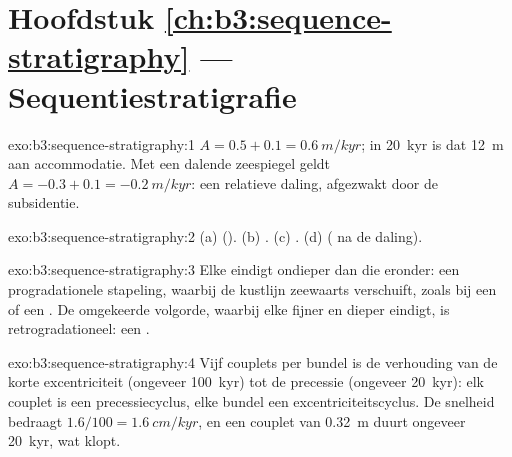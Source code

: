 \section*{Hoofdstuk \ref{ch:b3:sequence-stratigraphy} --- Sequentiestratigrafie}

\begin{solution}{exo:b3:sequence-stratigraphy:1}
$A = 0.5 + 0.1 = \qty{0.6}{m/kyr}$; in \qty{20}{kyr} is dat \qty{12}{m} aan
accommodatie. Met een dalende zeespiegel geldt $A = -0.3 + 0.1 = \qty{-0.2}{m/kyr}$: een relatieve daling,
afgezwakt door de subsidentie.
\end{solution}

\begin{solution}{exo:b3:sequence-stratigraphy:2}
(a)  (). (b) . (c)
. (d)  ( na de daling).
\end{solution}

\begin{solution}{exo:b3:sequence-stratigraphy:3}
Elke  eindigt ondieper dan die eronder: een progradationele stapeling,
waarbij de kustlijn zeewaarts verschuift, zoals bij een  of een . De
omgekeerde volgorde, waarbij elke  fijner en dieper eindigt, is retrogradationeel: een
.
\end{solution}

\begin{solution}{exo:b3:sequence-stratigraphy:4}
Vijf couplets per bundel is de verhouding van de korte excentriciteit (ongeveer
\qty{100}{kyr}) tot de precessie (ongeveer \qty{20}{kyr}): elk couplet is een
precessiecyclus, elke bundel een excentriciteitscyclus. De snelheid bedraagt
$1.6/100 = \qty{1.6}{cm/kyr}$, en een couplet van \qty{0.32}{m} duurt ongeveer
\qty{20}{kyr}, wat klopt.
\end{solution}

